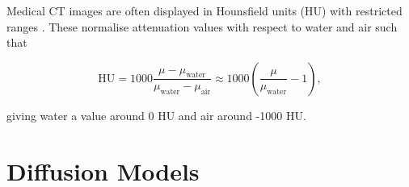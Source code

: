 Medical CT images are often displayed in Hounsfield units (HU) with restricted ranges \cite{}. These normalise attenuation values with respect to water and air such that

\begin{equation}
\text{HU}=1000\frac{\mu - \mu_\text{water}}{\mu_\text{water}-\mu_\text{air}}\approx 1000\left(\frac{\mu}{\mu_\text{water}}-1\right),
\label{eq:hounsfield_units}
\end{equation}

giving water a value around 0 HU and air around -1000 HU.

\section{Diffusion Models}
\label{sec:diffusion_models}








